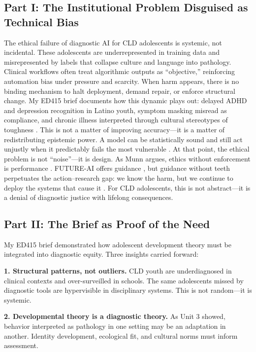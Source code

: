 \documentclass[12pt,a4paper]{article}
\begin{document}
\subsection{Part I: The Institutional Problem Disguised as Technical Bias}
The ethical failure of diagnostic AI for CLD adolescents is systemic, not incidental. These adolescents are underrepresented in training data and misrepresented by labels that collapse culture and language into pathology. Clinical workflows often treat algorithmic outputs as “objective,” reinforcing automation bias under pressure and scarcity. When harm appears, there is no binding mechanism to halt deployment, demand repair, or enforce structural change. My ED415 brief documents how this dynamic plays out: delayed ADHD and depression recognition in Latino youth, symptom masking misread as compliance, and chronic illness interpreted through cultural stereotypes of toughness \citep{GarciaBautista2025PuzzlePlan}. This is not a matter of improving accuracy—it is a matter of redistributing epistemic power. A model can be statistically sound and still act unjustly when it predictably fails the most vulnerable \citep{Marko2025}. At that point, the ethical problem is not “noise”—it is design. As Munn argues, ethics without enforcement is performance \citep{Munn2023}. FUTURE-AI offers guidance \citep{Lekadir2025}, but guidance without teeth perpetuates the action–research gap: we know the harm, but we continue to deploy the systems that cause it \citep{Marko2025}. For CLD adolescents, this is not abstract—it is a denial of diagnostic justice with lifelong consequences.

\subsection{Part II: The Brief as Proof of the Need}

My ED415 brief demonstrated how adolescent development theory must be integrated into diagnostic equity. Three insights carried forward:

\textbf{1. Structural patterns, not outliers.} CLD youth are underdiagnosed in clinical contexts and over-surveilled in schools. The same adolescents missed by diagnostic tools are hypervisible in disciplinary systems. This is not random—it is systemic.

\textbf{2. Developmental theory is a diagnostic theory.} As Unit 3 showed, behavior interpreted as pathology in one setting may be an adaptation in another. Identity development, ecological fit, and cultural norms must inform assessment.
\end{document}
